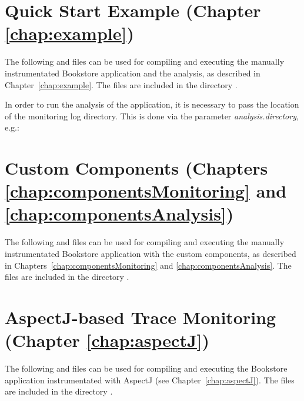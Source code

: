 \section{Quick Start Example (Chapter \ref{chap:example})}
The following  and  files can be %
used for compiling and executing the manually instrumentated Bookstore %
application and the analysis, as described in Chapter~\ref{chap:example}. %
The files are included in the directory \file{\manualInstrumentedBookstoreApplicationDirDistro{}/}.

      In order to run the analysis of the application, it is necessary to pass the location of the monitoring log directory. This is done via the parameter \textit{analysis.directory}, e.g.:
      \setBashListing
      

      \setPropertiesListing
      
      \setAntListing
      
\newpage
\section{Custom Components (Chapters \ref{chap:componentsMonitoring} and \ref{chap:componentsAnalysis})}
      The following  and  files can be used for compiling and executing the manually instrumentated Bookstore application with the custom components, as described in Chapters~\ref{chap:componentsMonitoring} and \ref{chap:componentsAnalysis}. %
The files are included in the directory \file{\customComponentsBookstoreApplicationDirDistro{}/}.
      \setPropertiesListing
      
      \setAntListing
      
\newpage
\section{AspectJ-based Trace Monitoring (Chapter \ref{chap:aspectJ})}
      The following  and  files can be used for compiling and executing the Bookstore application instrumentated with AspectJ (see Chapter~\ref{chap:aspectJ}). %
The files are included in the directory \file{\aspectJBookstoreApplicationDirDistro{}/}.
\vspace{-3ex}
      \setPropertiesListing
           
\enlargethispage{1.1cm}
      \setAntListing
      